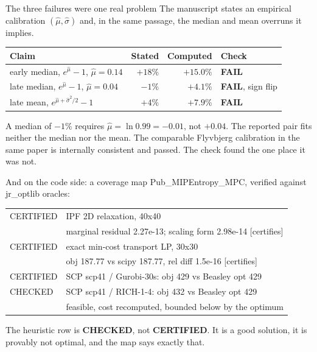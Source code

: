 \documentclass[aspectratio=169,11pt]{beamer}
\newcommand{\code}[1]{{\ttfamily\small #1}}
\newcommand{\FAIL}{{\color{badred}\bfseries FAIL}}
\newcommand{\CERT}{{\color{okgreen}\bfseries CERTIFIED}}
\newcommand{\CHK}{{\color{ink}\bfseries CHECKED}}
\begin{document}
\begin{frame}{The three failures were one real problem}
  The manuscript states an empirical calibration $(\hat\mu, \hat\sigma)$ and, in the same passage,
  the median and mean overruns it implies.
  \vfill
  \begin{center}
  \begin{tabular}{@{}lrrl@{}}
    \toprule
    \textbf{Claim} & \textbf{Stated} & \textbf{Computed} & \textbf{Check} \\
    \midrule
    early median, $e^{\hat\mu}-1$, $\hat\mu = 0.14$   & $+18\%$ & $+15.0\%$ & \FAIL \\
    late median,  $e^{\hat\mu}-1$, $\hat\mu = 0.04$   & $-1\%$  & $+4.1\%$  & \FAIL, sign flip \\
    late mean, $e^{\hat\mu+\hat\sigma^2/2}-1$         & $+4\%$  & $+7.9\%$  & \FAIL \\
    \bottomrule
  \end{tabular}
  \end{center}
  \vfill
  A median of $-1\%$ requires $\hat\mu = \ln 0.99 = -0.01$, not $+0.04$. The reported pair fits
  neither the median nor the mean.
  \vfill
  {\color{slate} The comparable Flyvbjerg calibration in the same paper is internally consistent
  and passed. The check found the one place it was not.}
\end{frame}

\begin{frame}{And on the code side: a coverage map}
  \code{Pub\_MIPEntropy\_MPC}, verified against \code{jr\_optlib} oracles:
  \vfill
  {\ttfamily\scriptsize
  \begin{tabular}{@{}l@{\hspace{0.6em}}l@{}}
  {\color{okgreen}CERTIFIED} & IPF 2D relaxation, 40x40 \\
   & marginal residual 2.27e-13; scaling form 2.98e-14 {\color{slate}[certifies]} \\[0.4em]
  {\color{okgreen}CERTIFIED} & exact min-cost transport LP, 30x30 \\
   & obj 187.77 vs scipy 187.77, rel diff 1.5e-16 {\color{slate}[certifies]} \\[0.4em]
  {\color{okgreen}CERTIFIED} & SCP scp41 / Gurobi-30s: obj 429 vs Beasley opt 429 \\[0.4em]
  {\color{ink}CHECKED} & SCP scp41 / RICH-1-4: obj 432 vs Beasley opt 429 \\
   & feasible, cost recomputed, bounded below by the optimum \\
  \end{tabular}}
  \vfill
  The heuristic row is \CHK, not \CERT. It is a good solution, it is provably not optimal, and the
  map says exactly that.
\end{frame}
\end{document}

